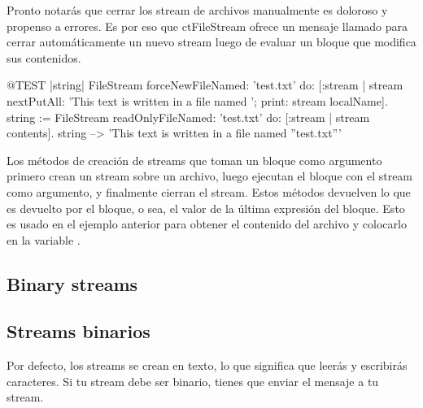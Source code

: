 \documentclass[a4paper,10pt,twoside]{book}
\begin{document}
{%
Pronto notar\'as que cerrar los stream de archivos manualmente es doloroso y propenso a errores. 
Es por eso que ct{FileStream} ofrece un mensaje llamado  
para cerrar autom\'aticamente un nuevo stream luego de evaluar un bloque que modifica sus contenidos. 

 
\begin{code}{@TEST |string|}
FileStream
    forceNewFileNamed: 'test.txt'
    do: [:stream |
        stream
            nextPutAll: 'This text is written in a file named ';
            print: stream localName].
string := FileStream
            readOnlyFileNamed: 'test.txt'
            do: [:stream | stream contents].
string --> 'This text is written in a file named ''test.txt'''
\end{code}

Los m\'etodos de creaci\'on de streams que toman un bloque como argumento
primero crean un stream sobre un archivo, luego ejecutan el bloque con 
el stream como argumento, y finalmente cierran el stream. Estos m\'etodos
devuelven lo que es devuelto por el bloque, o sea, el valor de la \'ultima
expresi\'on del bloque. Esto es usado en el ejemplo anterior para obtener
el contenido del archivo y colocarlo en la variable .

\subsection{Binary streams}
\subsection{Streams binarios}

Por defecto, los streams se crean en texto, lo que significa que leer\'as 
y escribir\'as caracteres. Si tu stream debe ser binario, 
tienes que enviar el mensaje  a tu stream.
 
}
\end{document}
